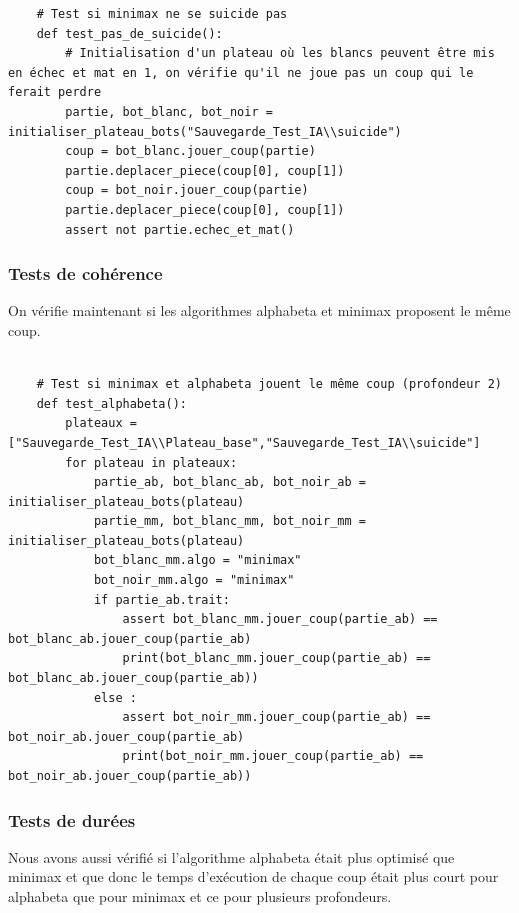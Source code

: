 \documentclass{article}
\begin{document}
\begin{verbatim}
    # Test si minimax ne se suicide pas 
    def test_pas_de_suicide():
        # Initialisation d'un plateau où les blancs peuvent être mis en échec et mat en 1, on vérifie qu'il ne joue pas un coup qui le ferait perdre
        partie, bot_blanc, bot_noir = initialiser_plateau_bots("Sauvegarde_Test_IA\\suicide")
        coup = bot_blanc.jouer_coup(partie)
        partie.deplacer_piece(coup[0], coup[1])
        coup = bot_noir.jouer_coup(partie)
        partie.deplacer_piece(coup[0], coup[1])
        assert not partie.echec_et_mat()    
\end{verbatim}

\subsubsection{Tests de cohérence}
On vérifie maintenant si les algorithmes alphabeta et minimax proposent le même coup.

\begin{verbatim}

    # Test si minimax et alphabeta jouent le même coup (profondeur 2)
    def test_alphabeta():
        plateaux = ["Sauvegarde_Test_IA\\Plateau_base","Sauvegarde_Test_IA\\suicide"]
        for plateau in plateaux:
            partie_ab, bot_blanc_ab, bot_noir_ab = initialiser_plateau_bots(plateau)
            partie_mm, bot_blanc_mm, bot_noir_mm = initialiser_plateau_bots(plateau)
            bot_blanc_mm.algo = "minimax"
            bot_noir_mm.algo = "minimax"
            if partie_ab.trait:
                assert bot_blanc_mm.jouer_coup(partie_ab) == bot_blanc_ab.jouer_coup(partie_ab)
                print(bot_blanc_mm.jouer_coup(partie_ab) == bot_blanc_ab.jouer_coup(partie_ab))
            else : 
                assert bot_noir_mm.jouer_coup(partie_ab) == bot_noir_ab.jouer_coup(partie_ab)
                print(bot_noir_mm.jouer_coup(partie_ab) == bot_noir_ab.jouer_coup(partie_ab))

\end{verbatim}

\subsubsection{Tests de durées}
Nous avons aussi vérifié si l'algorithme alphabeta était plus optimisé que minimax et que donc le temps d'exécution de chaque coup était plus court pour alphabeta que pour minimax et ce pour plusieurs profondeurs.
\end{document}
